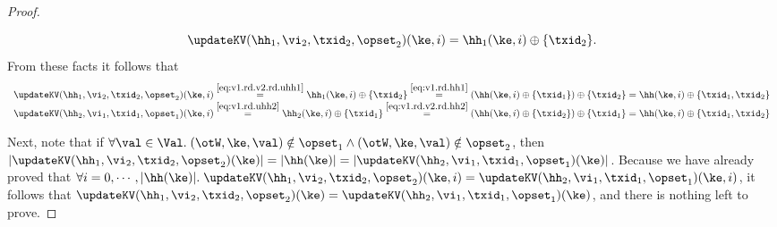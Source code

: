 \begin{proof}
\begin{enumerate}
\begin{enumerate}
\begin{equation}
\updateKV(\hh_1, \vi_2, \txid_2, \opset_2)(\ke, i) = \hh_1(\ke, i) \oplus \{ \txid_2\}.
\label{eq:v1.rd.v2.rd.uhh1}
\end{equation}
From these facts it follows that
\[
\begin{array}{l}
\updateKV(\hh_1, \vi_2, \txid_2, \opset_2)(\ke, i) \stackrel{\eqref{eq:v1.rd.v2.rd.uhh1}}{=} \hh_1(\ke, i) \oplus \{\txid_2\} \stackrel{\eqref{eq:v1.rd.hh1}}{=} 
(\hh(\ke, i) \oplus \{\txid_1\}) \oplus \{\txid_2 \} = \hh(\ke, i) \oplus \{\txid_1, \txid_2\}\\
\updateKV(\hh_2, \vi_1, \txid_1, \opset_1)(\ke, i) \stackrel{\eqref{eq:v1.rd.uhh2}}{=} \hh_2(\ke, i) \oplus \{\txid_1\} 
\stackrel{\eqref{eq:v1.rd.v2.rd.hh2}}{=} (\hh(\ke,i) \oplus \{\txid_2\}) \oplus \{\txid_1\} = \hh(\ke, i) \oplus \{\txid_1, \txid_2\}
\end{array}
\]
\end{enumerate}
\end{enumerate}

Next, note that if $\forall \val \in \Val.\;(\otW,\ke,\val) \notin \opset_1 \wedge (\otW, \ke, \val) \notin 
\opset_2$, then $\lvert \updateKV(\hh_1, \vi_2, \txid_2, \opset_2)(\ke) \rvert = \lvert \hh(\ke) \rvert 
= \lvert \updateKV(\hh_2, \vi_1, \txid_1, \opset_1)(\ke) \rvert$. 
Because we have already proved that $\forall i = 0,\cdots, \lvert \hh(\ke) \rvert.\; \updateKV(\hh_1, 
\vi_2, \txid_2, \opset_2)(\ke, i) = \updateKV(\hh_2, \vi_1, \txid_1, \opset_1)(\ke, i)$, it follows 
that $\updateKV(\hh_1, \vi_2, \txid_2, \opset_2)(\ke) = \updateKV(\hh_2,\vi_1,\txid_1,\opset_1)(\ke)$, 
and there is nothing left to prove.


\end{proof}
